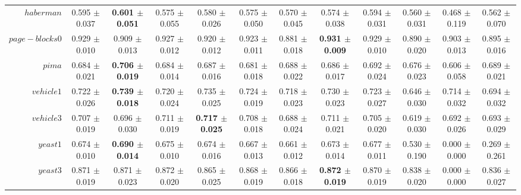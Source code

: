 \begin{table}[!ht]
{\begin{tabular}{r c c c c c c c c c c c}
$haberman$ & 0.595 $\pm$ 0.037 & \textbf{0.601 $\pm$ 0.051} & 0.575 $\pm$ 0.055 & 0.580 $\pm$ 0.026 & 0.575 $\pm$ 0.050 & 0.570 $\pm$ 0.045 & 0.574 $\pm$ 0.038 & 0.594 $\pm$ 0.031 & 0.560 $\pm$ 0.031 & 0.468 $\pm$ 0.119 & 0.562 $\pm$ 0.070 \\
$page-blocks0$ & 0.929 $\pm$ 0.010 & 0.909 $\pm$ 0.013 & 0.927 $\pm$ 0.012 & 0.920 $\pm$ 0.012 & 0.923 $\pm$ 0.011 & 0.881 $\pm$ 0.018 & \textbf{0.931 $\pm$ 0.009} & 0.929 $\pm$ 0.010 & 0.890 $\pm$ 0.020 & 0.903 $\pm$ 0.013 & 0.895 $\pm$ 0.016 \\
$pima$ & 0.684 $\pm$ 0.021 & \textbf{0.706 $\pm$ 0.019} & 0.684 $\pm$ 0.014 & 0.687 $\pm$ 0.016 & 0.681 $\pm$ 0.018 & 0.688 $\pm$ 0.022 & 0.686 $\pm$ 0.017 & 0.692 $\pm$ 0.024 & 0.676 $\pm$ 0.023 & 0.606 $\pm$ 0.058 & 0.689 $\pm$ 0.021 \\
$vehicle1$ & 0.722 $\pm$ 0.026 & \textbf{0.739 $\pm$ 0.018} & 0.720 $\pm$ 0.024 & 0.735 $\pm$ 0.025 & 0.724 $\pm$ 0.019 & 0.718 $\pm$ 0.023 & 0.730 $\pm$ 0.023 & 0.723 $\pm$ 0.027 & 0.646 $\pm$ 0.030 & 0.714 $\pm$ 0.032 & 0.694 $\pm$ 0.032 \\
$vehicle3$ & 0.707 $\pm$ 0.019 & 0.696 $\pm$ 0.030 & 0.711 $\pm$ 0.019 & \textbf{0.717 $\pm$ 0.025} & 0.708 $\pm$ 0.018 & 0.688 $\pm$ 0.024 & 0.711 $\pm$ 0.021 & 0.705 $\pm$ 0.020 & 0.619 $\pm$ 0.030 & 0.692 $\pm$ 0.026 & 0.693 $\pm$ 0.029 \\
$yeast1$ & 0.674 $\pm$ 0.010 & \textbf{0.690 $\pm$ 0.014} & 0.675 $\pm$ 0.010 & 0.674 $\pm$ 0.016 & 0.667 $\pm$ 0.013 & 0.661 $\pm$ 0.012 & 0.673 $\pm$ 0.014 & 0.677 $\pm$ 0.011 & 0.530 $\pm$ 0.190 & 0.000 $\pm$ 0.000 & 0.269 $\pm$ 0.261 \\
$yeast3$ & 0.871 $\pm$ 0.019 & 0.871 $\pm$ 0.023 & 0.872 $\pm$ 0.020 & 0.865 $\pm$ 0.025 & 0.868 $\pm$ 0.019 & 0.866 $\pm$ 0.018 & \textbf{0.872 $\pm$ 0.019} & 0.870 $\pm$ 0.019 & 0.838 $\pm$ 0.020 & 0.000 $\pm$ 0.000 & 0.836 $\pm$ 0.027 \\
\end{tabular}}
\end{table}
